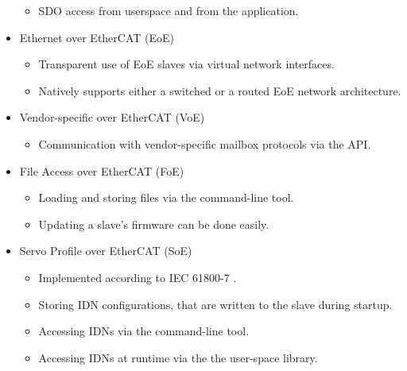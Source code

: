 \documentclass[a4paper,12pt,BCOR6mm,bibtotoc,idxtotoc]{scrbook}
\begin{document}
\begin{itemize}
\begin{itemize}
  \item SDO access from userspace and from the application.

  \end{itemize}

\item Ethernet over EtherCAT (EoE)

  \begin{itemize}

  \item Transparent use of EoE slaves via virtual network interfaces.

  \item Natively supports either a switched or a routed EoE network
  architecture.

  \end{itemize}

\item Vendor-specific over EtherCAT (VoE)

  \begin{itemize}

  \item Communication with vendor-specific mailbox protocols via the API.

  \end{itemize}

\item File Access over EtherCAT (FoE)

  \begin{itemize}

  \item Loading and storing files via the command-line tool.

  \item Updating a slave's firmware can be done easily.

  \end{itemize}

\item Servo Profile over EtherCAT (SoE)

  \begin{itemize}

  \item Implemented according to IEC 61800-7 \cite{soespec}.

  \item Storing IDN configurations, that are written to the slave during
  startup.

  \item Accessing IDNs via the command-line tool.

  \item Accessing IDNs at runtime via the the user-space library.


\end{itemize}
\end{itemize}
\end{document}
